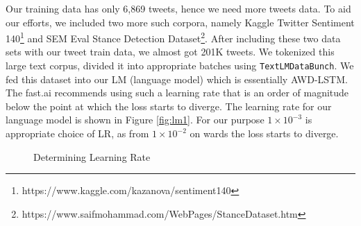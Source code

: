 Our training data has only 6,869 tweets, hence we need more tweets data. To aid our efforts, we included two more such corpora, namely Kaggle Twitter Sentiment 140\footnote{https://www.kaggle.com/kazanova/sentiment140} and SEM Eval Stance Detection Dataset\footnote{https://www.saifmohammad.com/WebPages/StanceDataset.htm}. After including these two data sets with our tweet train data, we almost got 201K tweets. We tokenized this large text corpus, divided it into appropriate batches using \verb|TextLMDataBunch|. We fed this dataset into our LM (language model) which is essentially AWD-LSTM. The fast.ai recommends using such a learning rate that is an order of magnitude below the point at which the loss starts to diverge.  The learning rate for our language model is shown in Figure \ref{fig:lm1}. For our purpose $1\times 10^{-3}$ is appropriate choice of LR, as from $1\times 10^{-2}$ on wards the loss starts to diverge. 


\begin{figure}
	\centering
	\caption{Determining Learning Rate}
	\label{fig:lr}
\end{figure}



